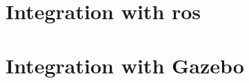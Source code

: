 \section{Integration with \gls{ros}}
\label{sec:vision_system_integration_ros}



\section{Integration with Gazebo}
\label{sec:vision_system_integration_gazebo}

